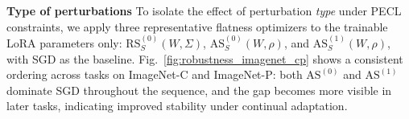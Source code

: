 \documentclass{article}
\theoremstyle{plain}
\theoremstyle{definition}
\theoremstyle{remark}
\begin{document}
\noindent\textbf{Type of perturbations }\quad
To isolate the effect of perturbation \emph{type} under PECL constraints, we apply three representative flatness optimizers to the {trainable LoRA parameters only}: 
$\mathrm{RS}^{(0)}_S(W,\Sigma)$, $\mathrm{AS}^{(0)}_S(W,\rho)$, and $\mathrm{AS}^{(1)}_S(W,\rho)$, 
with SGD as the baseline.
Fig.~\ref{fig:robustness_imagenet_cp} shows a consistent ordering across tasks on ImageNet-C and ImageNet-P: both $\mathrm{AS}^{(0)}$ and $\mathrm{AS}^{(1)}$ dominate SGD throughout the sequence, and the gap becomes more visible in later tasks, indicating improved stability under continual adaptation.
\end{document}
